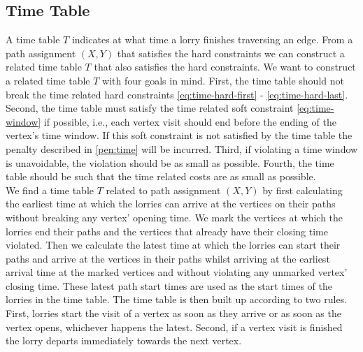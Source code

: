 \subsection{Time Table   }

\label{sec:time}

A time table $T$ indicates at what time a lorry finishes traversing an edge.
From a path assignment $(X,Y)$ that satisfies the hard constraints we can construct a related
time table $T$ that also satisfies the hard constraints.
We want to construct a related time table $T$ with four goals in mind.
First, the time table should not break  the time related hard constraints \eqref{eq:time-hard-first} - \eqref{eq:time-hard-last}.
Second, the time table  must satisfy the time related soft constraint \eqref{eq:time-window} if possible, i.e.,
each vertex visit should end before the ending of the vertex's time window.
If this soft constraint is not satisfied by the time table the penalty described in \eqref{pen:time} will be incurred.
Third, if violating a time window is unavoidable, the violation should be as small as possible.
Fourth, the time table should be such that the time related costs are as small as possible.
\\







We find a time table $T$ related to path assignment $(X,Y)$ by first calculating the earliest time at which the lorries can arrive at the vertices on their paths without breaking any vertex' opening time.
We mark the vertices at which the lorries end their paths and the vertices that already have their closing time violated.
Then we calculate the latest time at which the lorries can start their paths and arrive at the vertices in their paths
whilst arriving at the earliest arrival time at the marked vertices
and without violating any unmarked vertex' closing time.
These latest path start times are used as the start times of the lorries in the time table.
The time table is then built up according to two rules.
First, lorries start the visit of a vertex as soon as they arrive or as soon as the vertex opens, whichever happens the latest.
Second, if a vertex visit is finished the lorry departs immediately towards the next vertex.\\


